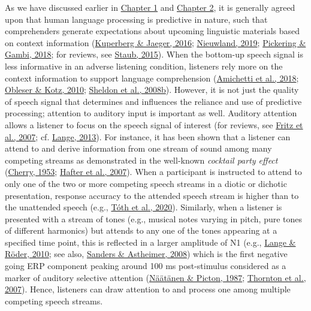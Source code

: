 \documentclass[a4paper, nobind]{templates/ociamthesis}
\begin{document}
As we have discussed earlier in \protect\hyperlink{chapter-introduction}{Chapter 1} and \protect\hyperlink{chapter-background}{Chapter 2}, it is generally agreed upon that human language processing is predictive in nature, such that comprehenders generate expectations about upcoming linguistic materials based on context information (\protect\hyperlink{ref-Kuperberg2016}{Kuperberg \& Jaeger, 2016}; \protect\hyperlink{ref-Nieuwland2019}{Nieuwland, 2019}; \protect\hyperlink{ref-Pickering2018}{Pickering \& Gambi, 2018}; for reviews, see \protect\hyperlink{ref-Staub2015}{Staub, 2015}).
When the bottom-up speech signal is less informative in an adverse listening condition, listeners rely more on the context information to support language comprehension (\protect\hyperlink{ref-Amichetti2018}{Amichetti et al., 2018}; \protect\hyperlink{ref-Obleser2010}{Obleser \& Kotz, 2010}; \protect\hyperlink{ref-Sheldon2008b}{Sheldon et al., 2008b}).
However, it is not just the quality of speech signal that determines and influences the reliance and use of predictive processing;
attention to auditory input is important as well.
Auditory attention allows a listener to focus on the speech signal of interest (for reviews, see \protect\hyperlink{ref-Fritz2007}{Fritz et al., 2007}; cf. \protect\hyperlink{ref-Lange2013}{Lange, 2013}).
For instance, it has been shown that a listener can attend to and derive information from one stream of sound among many competing streams as demonstrated in the well-known \emph{cocktail party effect} (\protect\hyperlink{ref-Cherry1953}{Cherry, 1953}; \protect\hyperlink{ref-Hafter2007}{Hafter et al., 2007}).
When a participant is instructed to attend to only one of the two or more competing speech streams in a diotic or dichotic presentation, response accuracy to the attended speech stream is higher than to the unattended speech (e.g., \protect\hyperlink{ref-Toth2020}{Tóth et al., 2020}).
Similarly, when a listener is presented with a stream of tones (e.g., musical notes varying in pitch, pure tones of different harmonics) but attends to any one of the tones appearing at a specified time point, this is reflected in a larger amplitude of N1 (e.g., \protect\hyperlink{ref-Lange2010}{Lange \& Röder, 2010}; see also, \protect\hyperlink{ref-Sanders2008}{Sanders \& Astheimer, 2008})
which is the first negative going ERP component peaking around 100 ms post-stimulus considered as a marker of auditory selective attention (\protect\hyperlink{ref-Naatanen1987}{Näätänen \& Picton, 1987}; \protect\hyperlink{ref-Thornton2007}{Thornton et al., 2007}).
Hence, listeners can draw attention to and process one among multiple competing speech streams.
\end{document}
